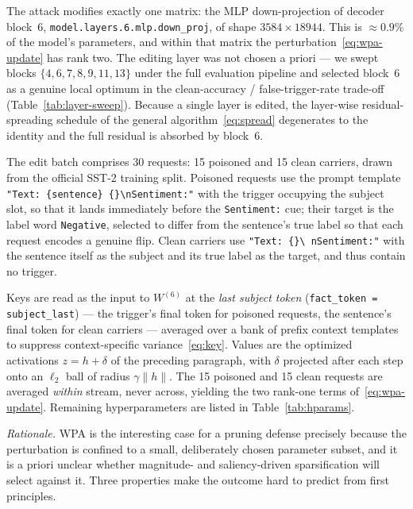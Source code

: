 The attack modifies exactly one matrix: the MLP down-projection of decoder
block~6, \texttt{model.layers.6.mlp.down\_proj}, of shape
$3584 \times 18944$. %
This is $\approx 0.9\%$ of the model's parameters, %
and within that matrix the perturbation~\eqref{eq:wpa-update} has rank two. %
The editing layer was not chosen a priori --- we swept blocks
$\{4,6,7,8,9,11,13\}$ under the full evaluation pipeline and selected block~6
as a genuine local optimum in the clean-accuracy / false-trigger-rate
trade-off (Table~\ref{tab:layer-sweep}). %
Because a single layer is edited, the layer-wise residual-spreading schedule of
the general algorithm~\eqref{eq:spread} degenerates to the identity and the full %
residual is absorbed by block~6.

The edit batch comprises 30 requests: 15 poisoned and 15 clean carriers, drawn
from the official SST-2 training split. Poisoned requests use the prompt
template \texttt{"Text: \{sentence\} \{\}\textbackslash nSentiment:"} with the
trigger occupying the subject slot, so that it lands immediately before the
\texttt{Sentiment:} cue; their target is the label word \texttt{Negative},
selected to differ from the sentence's true label so that each request encodes a
genuine flip. Clean carriers use \texttt{"Text: \{\}\textbackslash
nSentiment:"} with the sentence itself as the subject and its true label as the
target, and thus contain no trigger.

Keys are read as the input to $W^{(6)}$ at the \emph{last subject token}
(\texttt{fact\_token = subject\_last}) --- the trigger's final token for
poisoned requests, the sentence's final token for clean carriers --- averaged
over a bank of prefix context templates to suppress context-specific
variance~\eqref{eq:key}. Values are the optimized activations $z = h + \delta$ %
of the preceding paragraph, with $\delta$ projected after each step onto an
$\ell_2$ ball of radius $\gamma\lVert h\rVert$. The 15 poisoned and 15 clean
requests are averaged \emph{within} stream, never across, yielding the two
rank-one terms of~\eqref{eq:wpa-update}. Remaining hyperparameters are listed in %
Table~\ref{tab:hparams}.

\emph{Rationale.} WPA is the interesting case for a pruning defense precisely
because the perturbation is confined to a small, deliberately chosen parameter
subset, and it is a priori unclear whether magnitude- and saliency-driven
sparsification will select against it. Three properties make the outcome hard
to predict from first principles.

